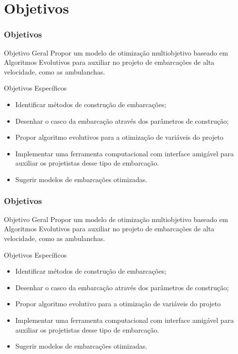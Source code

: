 \documentclass{beamer}
\begin{document}
\section{Objetivos}
\begin{frame}
\tableofcontents[ 
    currentsubsection, 
    hideothersubsections, 
    sectionstyle=show/shaded
    ] 
\end{frame}
\begin{frame}
\frametitle{Objetivos}
\large
\begin{block}{Objetivo Geral}
Propor um modelo de otimização multiobjetivo baseado em Algoritmos Evolutivos para auxiliar no projeto de embarcações de alta velocidade, como as ambulanchas.
\end{block}
\pause
\begin{block}{Objetivos Específicos}
\begin{itemize}
\item Identificar métodos de construção de embarcações;
\item Desenhar o casco da embarcação através dos parâmetros de construção;
\item Propor algoritmo evolutivos para a otimização de variáveis do projeto
\item Implementar uma ferramenta computacional com interface amigável para auxiliar os projetistas desse tipo de embarcação.
\item Sugerir modelos de embarcações otimizadas.
\end{itemize}

\end{block}
\end{frame}
\begin{frame}
\frametitle{Objetivos}
\large
\begin{block}{Objetivo Geral}
	Propor um modelo de otimização multiobjetivo baseado em Algoritmos Evolutivos para auxiliar no projeto de embarcações de alta velocidade, como as ambulanchas.
\end{block}
\begin{block}{Objetivos Específicos}
	\begin{itemize}
		\item \alert{Identificar métodos de construção de embarcações;}
		\item \alert{Desenhar o casco da embarcação através dos parâmetros de construção;}
		\item Propor algoritmo evolutivo para a otimização de variáveis do projeto
		\item Implementar uma ferramenta computacional com interface amigável para auxiliar os projetistas desse tipo de embarcação.
		\item Sugerir modelos de embarcações otimizadas.
	\end{itemize}
	
\end{block}
\end{frame}
\end{document}
